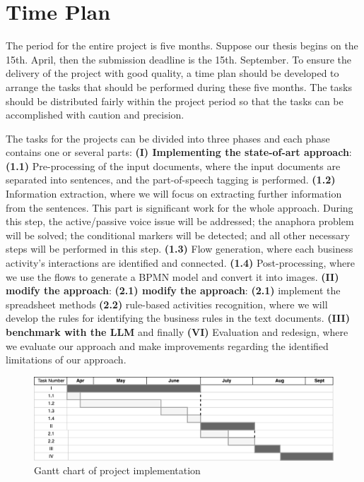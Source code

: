 \chapter{Time Plan}

The period for the entire project is five months. Suppose our thesis begins on the 15th. April, then the submission deadline is the 15th. September. To ensure the delivery of the project with good quality, a time plan should be developed to arrange the tasks that should be performed during these five months. The tasks should be distributed fairly within the project period so that the tasks can be accomplished with caution and precision.

The tasks for the projects can be divided into three phases and each phase contains one or several parts: \textbf{(I) Implementing the state-of-art approach}:  \textbf{(1.1)} Pre-processing of the input documents, where the input documents are separated into sentences, and the part-of-speech tagging is performed.  \textbf{(1.2)} Information extraction, where we will focus on extracting further information from the sentences. This part is significant work for the whole approach. During this step, the active/passive voice issue will be addressed; the anaphora problem will be solved; the conditional markers will be detected; and all other necessary steps will be performed in this step. \textbf{(1.3)} Flow generation, where each business activity's interactions are identified and connected. \textbf{(1.4)} Post-processing, where we use the flows to generate a BPMN model and convert it into images. \textbf{(II) modify the approach}: \textbf{(2.1) modify the approach}: \textbf{(2.1)} implement the spreadsheet methods  \textbf{(2.2)} rule-based activities recognition, where we will develop the rules for identifying the business rules in the text documents. \textbf{(III) benchmark with the LLM} and finally \textbf{(VI)} Evaluation and redesign, where we evaluate our approach and make improvements regarding the identified limitations of our approach.

\begin{figure}[h]
    \centering
    \caption{Gantt chart of project implementation}
    \includegraphics[width=1\textwidth]{tum-resources/images/time_plan.png}
\end{figure}